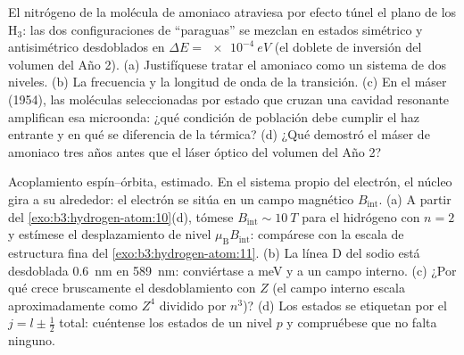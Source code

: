 \begin{exercise}[$\star\star$]\label{exo:b3:spin-two-level:9}
El nitrógeno de la molécula de amoniaco atraviesa por efecto túnel el plano
de los H$_3$: las dos configuraciones de ``paraguas'' se mezclan en estados
simétrico y antisimétrico desdoblados en $\Delta E = \qty{e-4}{eV}$ (el
doblete de inversión del volumen del Año 2). (a) Justifíquese tratar el
amoniaco como un sistema de dos niveles. (b) La frecuencia y la longitud de
onda de la transición. (c) En el máser (1954), las moléculas seleccionadas
por estado que cruzan una cavidad resonante amplifican esa microonda: ¿qué
condición de población debe cumplir el haz entrante y en qué se diferencia
de la térmica? (d) ¿Qué demostró el máser de amoniaco tres años antes que el
láser óptico del volumen del Año 2?
\end{exercise}

\begin{exercise}[$\star\star\star$]\label{exo:b3:spin-two-level:10}
Acoplamiento espín--órbita, estimado. En el sistema propio del electrón, el
núcleo gira a su alrededor: el electrón se sitúa en un campo magnético
$B_{\text{int}}$. (a) A partir del \cref{exo:b3:hydrogen-atom:10}(d), tómese
$B_{\text{int}} \sim \qty{10}{T}$ para el hidrógeno con $n = 2$ y estímese
el desplazamiento de nivel $\mu_{\text{B}}B_{\text{int}}$: compárese con la
escala de estructura fina del \cref{exo:b3:hydrogen-atom:11}. (b) La línea
D del sodio está desdoblada \qty{0.6}{nm} en \qty{589}{nm}: conviértase a
meV y a un campo interno. (c) ¿Por qué crece bruscamente el desdoblamiento
con $Z$ (el campo interno escala aproximadamente como $Z^4$ dividido por
$n^3$)? (d) Los estados se etiquetan por el $j = l \pm \tfrac12$ total:
cuéntense los estados de un nivel $p$ y compruébese que no falta ninguno.
\end{exercise}

